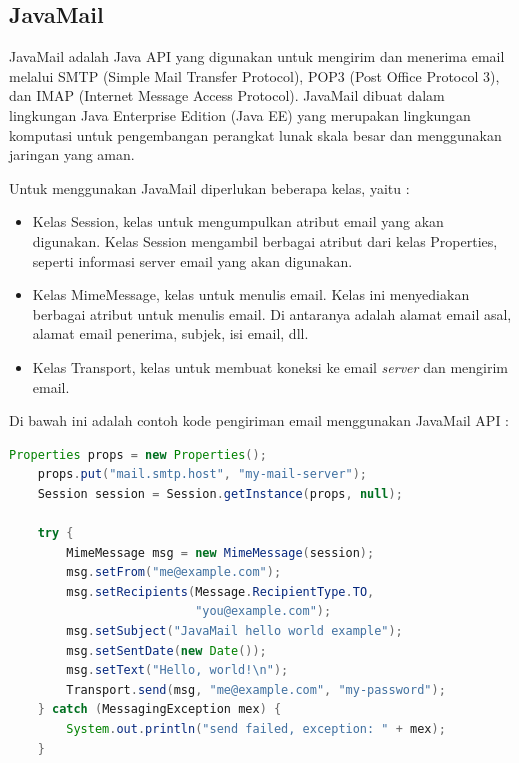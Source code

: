 \subsection{JavaMail}
\label{javamail}
JavaMail adalah Java API yang digunakan untuk mengirim dan menerima email melalui SMTP (Simple Mail Transfer Protocol), POP3 (Post Office Protocol 3), dan IMAP (Internet Message Access Protocol)\cite{javamail}. JavaMail dibuat dalam lingkungan Java Enterprise Edition (Java EE) yang merupakan lingkungan komputasi untuk pengembangan perangkat lunak skala besar dan menggunakan jaringan yang aman.


Untuk menggunakan JavaMail diperlukan beberapa kelas, yaitu :
\begin{itemize}
	\item Kelas Session, kelas untuk mengumpulkan atribut email yang akan digunakan. Kelas Session mengambil berbagai atribut dari kelas Properties, seperti informasi server email yang akan digunakan.
	\item Kelas MimeMessage, kelas untuk menulis email. Kelas ini menyediakan berbagai atribut untuk menulis email. Di antaranya adalah alamat email asal, alamat email penerima, subjek, isi email, dll.
	\item Kelas Transport, kelas untuk membuat koneksi ke email \textit{server} dan mengirim email.
\end{itemize}
Di bawah ini adalah contoh kode pengiriman email menggunakan JavaMail API : 
\begin{lstlisting}[language=Java,basicstyle=\tiny,caption=Contoh Kode Pengiriman Email]
Properties props = new Properties();
    props.put("mail.smtp.host", "my-mail-server");
    Session session = Session.getInstance(props, null);

    try {
        MimeMessage msg = new MimeMessage(session);
        msg.setFrom("me@example.com");
        msg.setRecipients(Message.RecipientType.TO,
                          "you@example.com");
        msg.setSubject("JavaMail hello world example");
        msg.setSentDate(new Date());
        msg.setText("Hello, world!\n");
        Transport.send(msg, "me@example.com", "my-password");
    } catch (MessagingException mex) {
        System.out.println("send failed, exception: " + mex);
    }
		
\end{lstlisting}


